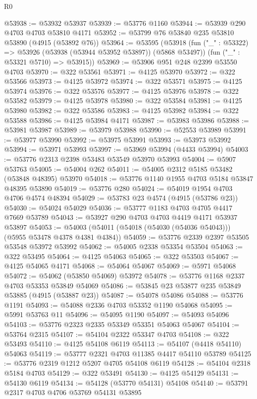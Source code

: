 \begin{lexlean}{R0}
\begin{coremodule}
@53938 := @53932 @53937
@53939 := @53776 @1160
@53944 := @53939 @290 @4703 @4703 @53810 @4171
@53952 := @53799 @76 @53840 @235 @53810 @53890 (@4915 (@53892 @76))
@53964 := @53595
    (@53918
      (fun ("_" : @53322) => @53926 (@53938 (@53944 @53952 @53897)) (@5868 @53497))
      (fun ("_" : @53321 @5710) => @53915))
@53969 := @53906 @951 @248 @2399 @53550 @4703
@53970 := @322 @53561
@53971 := @4125 @53970
@53972 := @322 @53566
@53973 := @4125 @53972
@53974 := @322 @53571
@53975 := @4125 @53974
@53976 := @322 @53576
@53977 := @4125 @53976
@53978 := @322 @53582
@53979 := @4125 @53978
@53980 := @322 @53584
@53981 := @4125 @53980
@53982 := @322 @53586
@53983 := @4125 @53982
@53984 := @322 @53588
@53986 := @4125 @53984 @4171
@53987 := @53983 @53986
@53988 := @53981 @53987
@53989 := @53979 @53988
@53990 := @52553 @53989
@53991 := @53977 @53990
@53992 := @53975 @53991
@53993 := @53973 @53992
@53994 := @53971 @53993
@53997 := @53969 @53994 (@4433 @53994)
@54003 := @53776 @2313 @2398 @53483 @53549 @53970 @53993
@54004 := @5907 @53763
@54005 := @54004 @262
@54011 := @54005 @2312 @5185 @53482 (@53848 @48395) @53970
@54018 := @53776 @1140 @1955 @4703 @5184 @53847 @48395 @53890
@54019 := @53776 @280
@54024 := @54019 @1954 @4703 @4706 @4574 @48394
@54029 := @53783 @23 @4574 (@4915 (@53786 @23))
@54030 := @54024 @54029
@54036 := @53777 @1183 @4703 @4705 @4417 @7669 @53789
@54043 := @53927 @290 @4703 @4703 @4419 @4171 @53937 @53897
@54053 := @54003 (@54011 (@54018 (@54030 (@54036 @54043))) (@5955 @53478 @4378 @4381 @4384))
@54059 := @53776 @2339 @2397 @53505 @53548 @53972 @53992
@54062 := @54005 @2338 @53354 @53504
@54063 := @322 @53495
@54064 := @4125 @54063
@54065 := @322 @53503
@54067 := @4125 @54065 @4171
@54068 := @54064 @54067
@54069 := @5971 @54068
@54072 := @54062 (@53850 @54069) @53972
@54078 := @53776 @1168 @2337 @4703 @53353 @53849 @54069
@54086 := @53845 @23 @53877 @235 @53849 @53885 (@4915 (@53887 @23))
@54087 := @54078 @54086
@54088 := @53776 @1191
@54093 := @54088 @2336 @4703 @53352 @1190 @54068
@54095 := @5991 @53763 @11
@54096 := @54095 @1190
@54097 := @54093 @54096
@54103 := @53776 @2323 @2335 @53349 @53351 @54063 @54067
@54104 := @53764 @2315
@54107 := @54104 @2322 @53347 @4703
@54108 := @322 @53493
@54110 := @4125 @54108 @6119
@54113 := @54107 (@4418 @54110) @54063
@54119 := @53777 @2321 @4703 @11385 @4417 @54110 @53789
@54125 := @53776 @2319 @1212 @5207 @4705 @54108 @6119
@54128 := @54104 @2318 @5184 @4703
@54129 := @322 @53491
@54130 := @4125 @54129
@54131 := @54130 @6119
@54134 := @54128 (@53770 @54131) @54108
@54140 := @53791 @2317 @4703 @4706 @53769 @54131 @53895

\end{coremodule}
\end{lexlean}
